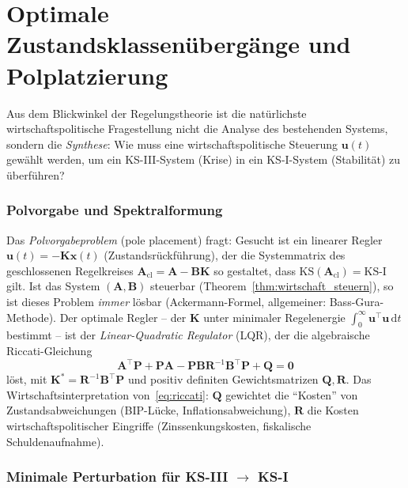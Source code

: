﻿\documentclass[12pt, a4paper, titlepage]{report}
\theoremstyle{definition}
\theoremstyle{remark}
\newcommand{\vx}{\bm{x}}
\newcommand{\vu}{\bm{u}}
\newcommand{\vA}{\bm{A}}
\newcommand{\vB}{\bm{B}}
\newcommand{\vP}{\bm{P}}
\newcommand{\vQ}{\bm{Q}}
\newcommand{\vK}{\bm{K}}
\newcommand{\vR}{\bm{R}}
\newcommand{\T}{\top}
\newcommand{\KS}{\mathrm{KS}}
\begin{document}
\section{Optimale Zustandsklassenübergänge und Polplatzierung}
\label{subsec:polplatz}

Aus dem Blickwinkel der Regelungstheorie ist die natürlichste wirtschaftspolitische
Fragestellung nicht die Analyse des bestehenden Systems, sondern die
\emph{Synthese}: Wie muss eine wirtschaftspolitische Steuerung $\vu(t)$ gewählt
werden, um ein KS-III-System (Krise) in ein KS-I-System (Stabilität)
zu überführen?

\subsubsection*{Polvorgabe und Spektralformung}

Das \emph{Polvorgabeproblem} (pole placement) fragt: Gesucht ist ein linearer
Regler $\vu(t) = -\vK\vx(t)$ (Zustandsrückführung), der die Systemmatrix des
geschlossenen Regelkreises $\vA_{\mathrm{cl}} = \vA - \vB\vK$ so gestaltet, dass
$\KS(\vA_{\mathrm{cl}}) = \KS\text{-I}$ gilt. Ist das System $(\vA, \vB)$ steuerbar
(Theorem~\ref{thm:wirtschaft_steuern}), so ist dieses Problem \emph{immer} lösbar
(Ackermann-Formel, allgemeiner: Bass-Gura-Methode). Der optimale Regler -- der
$\vK$ unter minimaler Regelenergie $\int_0^\infty \vu^\T\vu\,\mathrm{d}t$ bestimmt --
ist der \emph{Linear-Quadratic Regulator} (LQR), der die algebraische Riccati-Gleichung
\begin{equation}
  \vA^\T\vP + \vP\vA - \vP\vB\vR^{-1}\vB^\T\vP + \vQ = \bm{0}
  \label{eq:riccati}
\end{equation}
löst, mit $\vK^* = \vR^{-1}\vB^\T\vP$ und positiv definiten Gewichtsmatrizen
$\vQ, \vR$. Das Wirtschaftsinterpretation von~\eqref{eq:riccati}: $\vQ$ gewichtet
die ``Kosten'' von Zustandsabweichungen (BIP-Lücke, Inflationsabweichung),
$\vR$ die Kosten wirtschaftspolitischer Eingriffe (Zinssenkungskosten,
fiskalische Schuldenaufnahme).

\subsubsection*{Minimale Perturbation für KS-III $\to$ KS-I}
\end{document}
